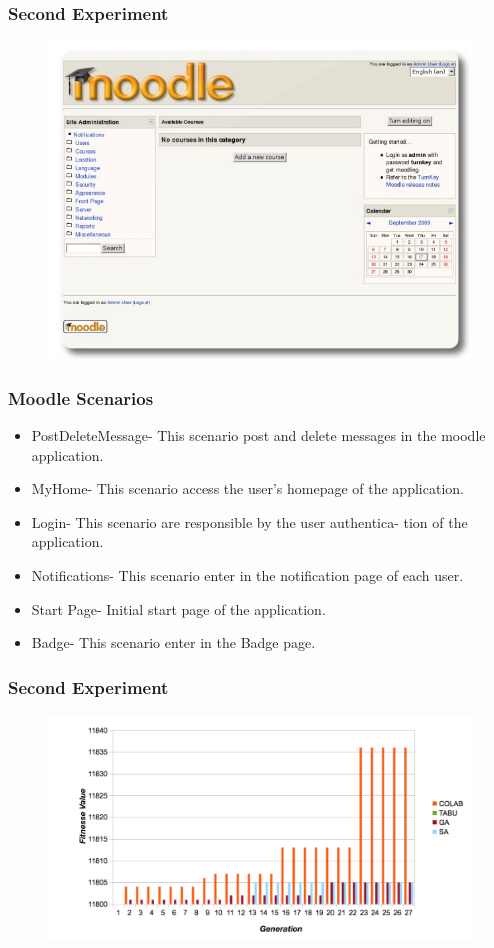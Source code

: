 \documentclass{beamer}
\begin{document}
\begin{frame}
\frametitle{Second Experiment}
\begin{figure}[H]
\centering
\includegraphics[width=0.8\linewidth]{moodle.jpg}
\end{figure}
\end{frame}


\begin{frame}
\frametitle{Moodle Scenarios}
\begin{itemize}
\item PostDeleteMessage- This scenario post and delete messages in the moodle application.
\item  MyHome- This scenario access the user’s homepage of the application.
\item Login- This scenario are responsible by the user authentica- tion of the application.
\item Notifications- This scenario enter in the notification page of each user.
\item Start Page- Initial start page of the application.
\item Badge- This scenario enter in the Badge page.
\end{itemize}
\end{frame}


\begin{frame}
\frametitle{Second Experiment}
\begin{figure}[H]
\centering
\includegraphics[width=1\linewidth]{generationcomparative.PNG}
\end{figure}
\end{frame}
\end{document}

